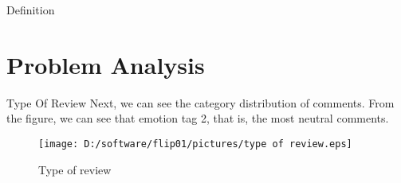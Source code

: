 \documentclass[
 size=12pt,
 paper=smartboard, %
 mode=present, %
 display=slides, %
style=tuliplab,
pauseslide,
fleqn,leqno]{powerdot}
\begin{document}
\begin{slide}{Definition}
\section{Problem Analysis}

\begin{slide}[toc=,bm=]{Type Of Review}
  Next, we can see the category distribution of comments. From the figure, we can see that emotion tag 2, that is, the most neutral comments. 
\begin{figure}[ht]%
  \centering%
  \texttt{[image: D:/software/flip01/pictures/type of review.eps]}
  \caption{Type of review}%
  \end{figure}
  \vspace{1cm}
 
\end{slide}


\end{slide}
\end{document}
